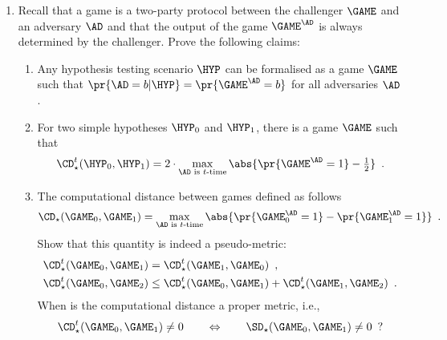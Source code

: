 \documentclass{article}
\begin{document}
\begin{enumerate}
\item Recall that a game is a two-party protocol between the
  challenger $\GAME$ and an adversary $\AD$ and that the output of the
  game $\GAME^\AD$ is always determined by the challenger. Prove the
  following claims:
  \begin{enumerate}
  \item Any hypothesis testing scenario $\HYP$ can be formalised as a
    game $\GAME$ such that $\pr{\AD=b|\HYP}=\pr{\smash{\GAME^\AD=b}}$
    for all adversaries $\AD$.
  \item For two simple hypotheses $\HYP_0$ and $\HYP_1$, there is a
    game $\GAME$ such that
    \begin{align*}
      \CD_\star^t(\HYP_0,\HYP_1)=2\cdot\max_{\AD\text{ is
          $t$-time}}\abs{\pr{\smash{\GAME^\AD=1}}-{\textstyle\frac{1}{2}}}\enspace.
    \end{align*}
  \item The computational distance between  games defined as follows
    \begin{align*}
      \CD_\star(\GAME_0,\GAME_1)=\max_{\AD\text{ is
          $t$-time}}\abs{\pr{\smash{\GAME_0^\AD=1}}-\pr{\smash{\GAME_1^\AD=1}}}\enspace.
    \end{align*}
  Show that this quantity is indeed a pseudo-metric:
   \begin{align*}
     \CD_\star^t(\GAME_0,\GAME_1)&=\CD_\star^t(\GAME_1,\GAME_0)\enspace,\\
     \CD_\star^t(\GAME_0,\GAME_2) &\leq \CD_\star^t(\GAME_0,\GAME_1)+\CD_\star^t(\GAME_1,\GAME_2)\enspace. 
   \end{align*}
   When is the computational distance a proper metric, i.e.,  
   \begin{align*}
     \CD_\star^t(\GAME_0,\GAME_1)\neq 0\qquad\Leftrightarrow\qquad \SD_\star(\GAME_0,\GAME_1)\neq 0\enspace?
   \end{align*}
  \end{enumerate}



\end{enumerate}
\end{document}

